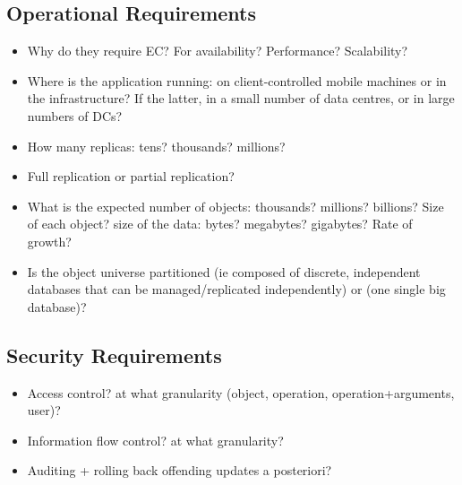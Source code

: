 \documentclass[11pt,a4paper]{report}
\begin{document}
\subsection{Operational Requirements}
\begin{itemize}
\item Why do they require EC?  For availability?  Performance?  Scalability?
\item Where is the application running: on client-controlled mobile machines or in the infrastructure?    If the latter, in a small number of data centres, or in large numbers of DCs?
\item How many replicas: tens?  thousands?  millions?
\item Full replication or partial replication?
\item What is the expected number of objects: thousands? millions? billions?  Size of each object?  size of the data: bytes? megabytes? gigabytes?  Rate of growth?
\item Is the object universe partitioned (ie composed of discrete, independent databases that can be managed/replicated independently) or (one single big database)?
\end{itemize}

\subsection{Security Requirements}
\begin{itemize}
\item Access control?  at what granularity (object, operation, operation+arguments, user)?
\item Information flow control?  at what granularity?
\item Auditing + rolling back offending updates a posteriori?
\end{itemize}

\label{LastPage}
\end{document}
